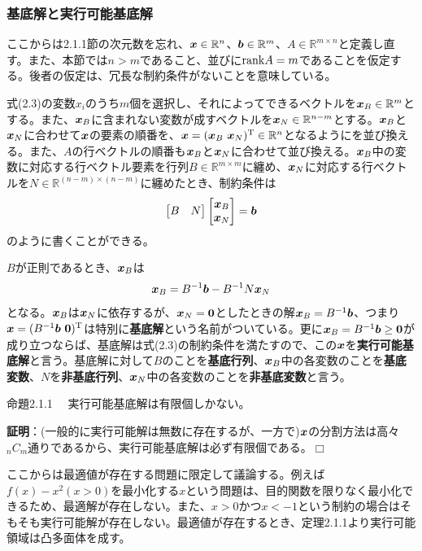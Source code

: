 \documentclass[dvipdfmx, 9pt, a4paper]{jsarticle}
\numberwithin{equation}{section}
\newcommand{\bm}[1]{{\mbox{\boldmath $#1$}}}
\def\qed{\hfill $\Box$}
\begin{document}
\subsubsection{基底解と実行可能基底解}
ここからは2.1.1節の次元数を忘れ、$\bm x \in \mathbb{R}^n$、$\bm b \in \mathbb{R}^m$、$A \in \mathbb{R}^{m \times n}$と定義し直す。また、本節では$n > m$であること、並びに${\rm rank}A=m$であることを仮定する。後者の仮定は、冗長な制約条件がないことを意味している。\par
式(2.3)の変数$x_i$のうち$m$個を選択し、それによってできるベクトルを$\bm x_B \in \mathbb{R}^m$とする。また、$\bm x_B$に含まれない変数が成すベクトルを$\bm x_N \in \mathbb{R}^{n-m}$とする。$\bm x_B$と$\bm x_N$に合わせて$\bm x$の要素の順番を、$\bm x=(\bm x_B~\bm x_N)^{\rm T} \in \mathbb{R}^n$となるようにを並び換える。また、$A$の行ベクトルの順番も$\bm x_B$と$\bm x_N$に合わせて並び換える。$\bm x_B$中の変数に対応する行ベクトル要素を行列$B \in \mathbb{R}^{m \times m}$に纏め、$\bm x_N$に対応する行ベクトルを$N \in \mathbb{R}^{(n-m)\times (n-m)}$に纏めたとき、制約条件は
\begin{equation}
\begin{bmatrix}
B & N
\end{bmatrix}
\begin{bmatrix}
\bm x_B \\ \bm x_N
\end{bmatrix}
=\bm b
\end{equation}
のように書くことができる。\par
$B$が正則であるとき、$\bm x_B$は
\begin{equation}
\bm x_B=B^{-1}\bm b - B^{-1}N\bm x_N
\end{equation}
となる。$\bm x_B$は$\bm x_N$に依存するが、$\bm x_N=\bm 0$としたときの解$\bm x_B=B^{-1}\bm b$、つまり$\bm x = (B^{-1}\bm b~\bm 0)^{\rm T}$は特別に{\bf 基底解}という名前がついている。更に$\bm x_B = B^{-1}\bm b \geq \bm 0$が成り立つならば、基底解は式(2.3)の制約条件を満たすので、この$\bm x$を{\bf 実行可能基底解}と言う。基底解に対して$B$のことを{\bf 基底行列}、$\bm x_B$中の各変数のことを{\bf 基底変数}、$N$を{\bf 非基底行列}、$\bm x_N$中の各変数のことを{\bf 非基底変数}と言う。
\begin{itembox}[l]{命題2.1.1}
　実行可能基底解は有限個しかない。
\end{itembox}
{\bf 証明}：(一般的に実行可能解は無数に存在するが、一方で)$\bm x$の分割方法は高々${}_nC_m$通りであるから、実行可能基底解は必ず有限個である。\qed \par
ここからは最適値が存在する問題に限定して議論する。例えば$f(x)-x^2(x>0)$を最小化する$x$という問題は、目的関数を限りなく最小化できるため、最適解が存在しない。また、$x>0$かつ$x<-1$という制約の場合はそもそも実行可能解が存在しない。最適値が存在するとき、定理2.1.1より実行可能領域は凸多面体を成す。\par
\end{document}
